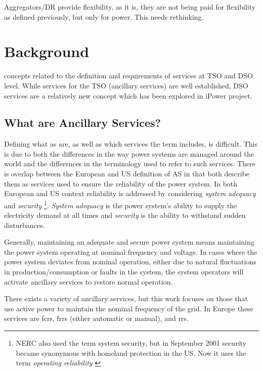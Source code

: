 Aggregators/DR provide flexibility, as it is, they are not being paid for flexibility as defined previously, but only for power. This needs rethinking.
\section{Background} %
 concepts related to the definition and requirements of services at TSO and DSO level. While services for the TSO (ancillary services) are well established, DSO services are a relatively new concept which has been explored in iPower project.
\label{sec:backgroundservices}
\subsection{What are Ancillary Services?} %
\label{sub:ancillaryservicesdef}
Defining what \gls{as} are, as well as which services the term includes, is difficult. This is due to both the differences in the way power systems are managed around the world and the differences in the terminology used to refer to such services. There is overlap between the European and US definition of AS in that both describe them as services used to ensure the reliability of the power system. In both European and US context reliability is addressed by considering \emph{system adequacy} and \emph{security} \footnote{NERC also used the term system security, but in September 2001 security became synonymous with homeland protection in the US. Now it uses the term \emph{operating reliability} \cite{nerc2007definition}}. \emph{System adequacy} is the power system's ability to supply the electricity demand at all times and \emph{security} is the ability to withstand sudden disturbances.

Generally, maintaining an adequate and secure power system means maintaining the power system operating at nominal frequency and voltage. In cases where the power system deviates from nominal operation, either due to natural fluctuations in production/consumption or faults in the system, the system operators will activate ancillary services to restore normal operation. 

There exists a variety of ancillary services, but this work focuses on those that use active power to maintain the nominal frequency of the grid. In Europe these services are \glspl{fcr}, \glspl{frr} (either automatic or manual), and \glspl{rr}.
